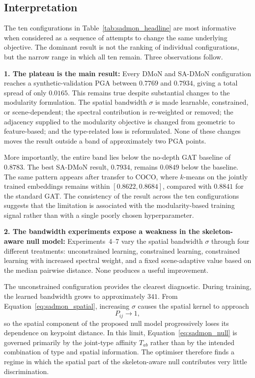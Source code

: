 \subsection{Interpretation}
\label{sec_res_sadmon_discussion}

The ten configurations in Table~\ref{tab:sadmon_headline} are most
informative when considered as a sequence of attempts to change the
same underlying objective. The dominant result is not the ranking of
individual configurations, but the narrow range in which all ten
remain. Three observations follow.

\textbf{1. The plateau is the main result:}
Every DMoN and SA-DMoN configuration reaches a synthetic-validation
PGA between $0.7769$ and $0.7934$, giving a total spread of only
$0.0165$. This remains true despite substantial changes to the
modularity formulation. The spatial bandwidth $\sigma$ is made
learnable, constrained, or scene-dependent; the spectral contribution
is re-weighted or removed; the adjacency supplied to the modularity
objective is changed from geometric to feature-based; and the
type-related loss is reformulated. None of these changes moves the
result outside a band of approximately two PGA points.

More importantly, the entire band lies below the no-depth GAT baseline
of $0.8783$. The best SA-DMoN result, $0.7934$, remains $0.0849$ below
the baseline. The same pattern appears after transfer to COCO, where
$k$-means on the jointly trained embeddings remains within
$[0.8622,0.8684]$, compared with $0.8841$ for the standard GAT.
The consistency of the result across the ten configurations suggests
that the limitation is associated with the modularity-based training
signal rather than with a single poorly chosen hyperparameter.

\textbf{2. The bandwidth experiments expose a weakness in the
skeleton-aware null model:}
Experiments~4--7 vary the spatial bandwidth $\sigma$ through four
different treatments: unconstrained learning, constrained learning,
constrained learning with increased spectral weight, and a fixed
scene-adaptive value based on the median pairwise distance. None
produces a useful improvement.

The unconstrained configuration provides the clearest diagnostic.
During training, the learned bandwidth grows to approximately $341$.
From Equation~\eqref{eq:sadmon_spatial}, increasing $\sigma$ causes
the spatial kernel to approach
\begin{equation}
    P_{ij} \rightarrow 1,
\end{equation}
so the spatial component of the proposed null model progressively
loses its dependence on keypoint distance. In this limit,
Equation~\eqref{eq:sadmon_null} is governed primarily by the
joint-type affinity $T_{ab}$ rather than by the intended combination
of type and spatial information. The optimiser therefore finds a
regime in which the spatial part of the skeleton-aware null contributes
very little discrimination.

